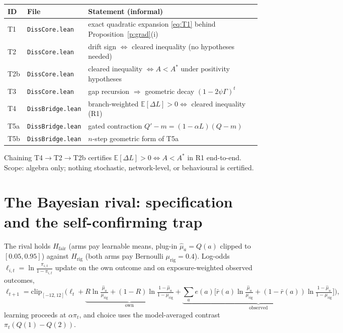 \documentclass[11pt]{article}
\newcommand{\E}{\mathbb{E}}
\newcommand{\1}{\mathbf{1}}
\newcommand{\Astar}{A^{*}}
\begin{document}
\begin{center}\small
\begin{tabular}{llp{8.0cm}}
\toprule
ID & File & Statement (informal) \\
\midrule
T1 & \texttt{DissCore.lean} & exact quadratic expansion \eqref{eq:T1} behind Proposition~\ref{p:grad}(i) \\
T2 & \texttt{DissCore.lean} & drift sign $\iff$ cleared inequality (no hypotheses needed) \\
T2b & \texttt{DissCore.lean} & cleared inequality $\iff A<\Astar$ under positivity hypotheses \\
T3 & \texttt{DissCore.lean} & gap recursion $\Rightarrow$ geometric decay $(1-2\psi\Gamma)^t$ \\
T4 & \texttt{DissBridge.lean} & branch-weighted $\E[\Delta L]>0 \iff$ cleared inequality (R1) \\
T5a & \texttt{DissBridge.lean} & gated contraction $Q'-m=(1-\alpha L)(Q-m)$ \\
T5b & \texttt{DissBridge.lean} & $n$-step geometric form of T5a \\
\bottomrule
\end{tabular}
\end{center}

\noindent Chaining T4$\to$T2$\to$T2b certifies $\E[\Delta L]>0\iff A<\Astar$ in R1 end-to-end. Scope: algebra only; nothing stochastic, network-level, or behavioural is certified.

\section{The Bayesian rival: specification and the self-confirming trap}
\label{s:rival}

The rival holds $H_{\mathrm{fair}}$ (arms pay learnable means, plug-in $\hat\mu_a=Q(a)$ clipped to $[0.05,0.95]$) against $H_{\mathrm{rig}}$ (both arms pay Bernoulli $\mu_{\mathrm{rig}}=0.4$). Log-odds $\ell_{i,t}=\ln\frac{\pi_{i,t}}{1-\pi_{i,t}}$ update on the own outcome and on exposure-weighted observed outcomes,
\begin{equation}
\ell_{t+1}=\mathrm{clip}_{[-12,12]}\Big(\ell_t+\underbrace{R\ln\tfrac{\hat\mu_{a}}{\mu_{\mathrm{rig}}}+(1-R)\ln\tfrac{1-\hat\mu_{a}}{1-\mu_{\mathrm{rig}}}}_{\text{own}}+\underbrace{\textstyle\sum_a e(a)\big[\bar r(a)\ln\tfrac{\hat\mu_a}{\mu_{\mathrm{rig}}}+(1-\bar r(a))\ln\tfrac{1-\hat\mu_a}{1-\mu_{\mathrm{rig}}}\big]}_{\text{observed}}\Big),
\end{equation}
learning proceeds at $\alpha\pi_t$, and choice uses the model-averaged contrast $\pi_t(Q(1)-Q(2))$.
\end{document}
